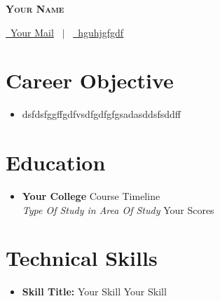 \documentclass[letterpaper,5pt]{article}
\begin{document}
    
    \begin{center}
      \textbf{\Huge \scshape Your Name} \\ \vspace{5pt}
      
      \href{mailto:mail@mail.com}{\raisebox{-0.05\height}\faEnvelope \ Your Mail} 
      \ $|$ \ \href{tel:hguhjgfgdf}{\raisebox{-0.05\height}\faMobile \ hguhjgfgdf}  \
       \
       \
    \end{center}
    
      \section{Career Objective}
        \begin{itemize}[leftmargin=0.15in, label={}]
          \item{dsfdsfggffgdfvsdfgdfgfgsadasddsfsddff}
        \end{itemize}
    
    \section{Education}
      
        \begin{itemize}
        \item
            \textbf{Your College} \hfill Course Timeline \\
            \textit{Type Of Study in Area Of Study} \hfill Your Scores
        \end{itemize}
      
      

    
    \section{Technical Skills}
    
        \begin{itemize}[leftmargin=0.15in,label={}]
        \item{
          \textbf{Skill Title: }{\textbullet{} Your Skill \textbullet{} Your Skill \newline}
        }
        \end{itemize}
        \vspace*{-6mm}  
        
\end{document}
